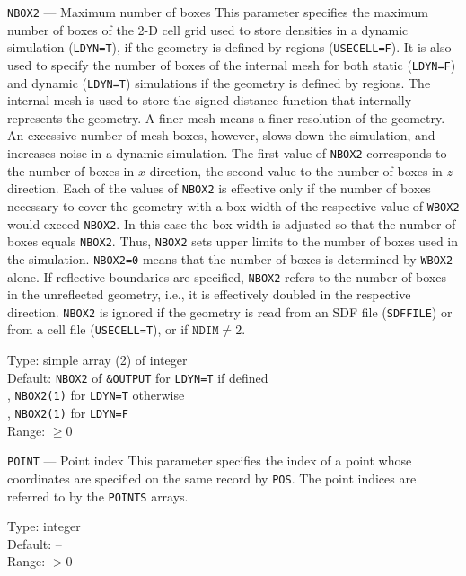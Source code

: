 \begin{keydescription}{\texttt{NBOX2} --- Maximum number of boxes}
%
  This parameter specifies the maximum number of boxes of the 2-D cell grid 
  used to store densities in a dynamic simulation (\texttt{LDYN=T}), if the 
  geometry is defined by regions (\texttt{USECELL=F}). 
  It is also used to specify the number of boxes of the internal mesh for both
  static (\texttt{LDYN=F}) and dynamic (\texttt{LDYN=T}) simulations if the
  geometry is defined by regions.
  The internal mesh is used to store the signed distance function that
  internally represents the geometry.
  A finer mesh means a finer resolution of the geometry.
  An excessive number of mesh boxes, however, slows down the simulation, and
  increases noise in a dynamic simulation.
  The first value of \texttt{NBOX2} corresponds to the number of boxes in 
  $x$ direction, the second value to the number of boxes in $z$ direction. 
  Each of the values of \texttt{NBOX2} is effective only if the number of 
  boxes necessary to cover the geometry with a box width of the respective 
  value of \texttt{WBOX2} would exceed \texttt{NBOX2}. 
  In this case the box width is adjusted so that the number of boxes equals 
  \texttt{NBOX2}. 
  Thus, \texttt{NBOX2} sets upper limits to the number of boxes used in the 
  simulation. 
  \texttt{NBOX2=0} means that the number of boxes is determined by 
  \texttt{WBOX2} alone. 
  If reflective boundaries are specified, \texttt{NBOX2} refers to the number
  of boxes in the unreflected geometry, i.e., it is effectively doubled in 
  the respective direction.
  \texttt{NBOX2} is ignored if the geometry is read from an SDF file 
  (\texttt{SDFFILE}) or from a cell file (\texttt{USECELL=T}), or if 
  $\texttt{NDIM} \ne 2$.
  \begin{keytab}
    Type:    \> simple array (2) of integer \\
    Default: \> \texttt{NBOX2} of \texttt{\&OUTPUT} for \texttt{LDYN=T} if
                defined \\
             , \texttt{NBOX2(1)} for \texttt{LDYN=T} otherwise \\
             , \texttt{NBOX2(1)} for \texttt{LDYN=F} \\
    Range:   \> $\ge 0$
  \end{keytab}
\end{keydescription}

\begin{keydescription}{\texttt{POINT} --- Point index}
%
  This parameter specifies the index of a point whose coordinates are specified
  on the same record by \texttt{POS}. The point indices are referred to by the
  \texttt{POINTS} arrays. 
  \begin{keytab}
    Type:    \> integer \\
    Default: \> -- \\
    Range:   \> $>0$ 
  \end{keytab}
\end{keydescription}


